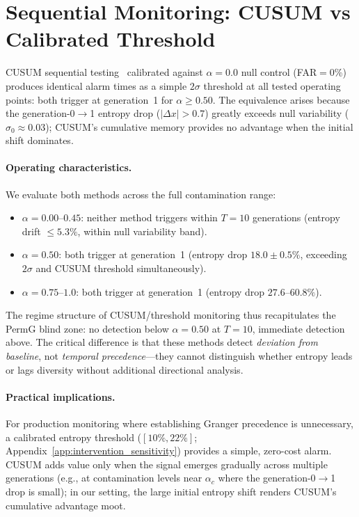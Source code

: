 \section{Sequential Monitoring: CUSUM vs Calibrated Threshold}
\label{app:csmp}

CUSUM sequential testing~\citep{page1954continuous} calibrated against $\alpha{=}0.0$ null control (FAR${=}$0\%) produces identical alarm times as a simple $2\sigma$ threshold at all tested operating points: both trigger at generation~1 for $\alpha{\geq}0.50$.
The equivalence arises because the generation-0$\to$1 entropy drop ($|\Delta x|{>}0.7$) greatly exceeds null variability ($\sigma_0{\approx}0.03$); CUSUM's cumulative memory provides no advantage when the initial shift dominates.

\paragraph{Operating characteristics.}
We evaluate both methods across the full contamination range:
\begin{itemize}
\item $\alpha{=}0.00$--$0.45$: neither method triggers within $T{=}10$ generations (entropy drift ${\leq}5.3\%$, within null variability band).
\item $\alpha{=}0.50$: both trigger at generation~1 (entropy drop $18.0{\pm}0.5\%$, exceeding $2\sigma$ and CUSUM threshold simultaneously).
\item $\alpha{=}0.75$--$1.0$: both trigger at generation~1 (entropy drop $27.6$--$60.8\%$).
\end{itemize}
The regime structure of CUSUM/threshold monitoring thus recapitulates the PermG blind zone: no detection below $\alpha{=}0.50$ at $T{=}10$, immediate detection above.
The critical difference is that these methods detect \emph{deviation from baseline}, not \emph{temporal precedence}---they cannot distinguish whether entropy leads or lags diversity without additional directional analysis.

\paragraph{Practical implications.}
For production monitoring where establishing Granger precedence is unnecessary, a calibrated entropy threshold ($[10\%, 22\%]$; Appendix~\ref{app:intervention_sensitivity}) provides a simple, zero-cost alarm.
CUSUM adds value only when the signal emerges gradually across multiple generations (e.g., at contamination levels near $\alpha_c$ where the generation-0$\to$1 drop is small); in our setting, the large initial entropy shift renders CUSUM's cumulative advantage moot.

